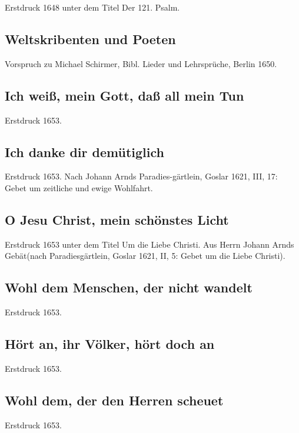 Erstdruck 1648 unter dem Titel \frqq Der 121. Psalm\flqq .

\subsection*{ Weltskribenten und Poeten}

Vorspruch zu Michael Schirmer, \frqq Bibl. Lieder und Lehrsprüche\flqq , Berlin
1650.

\subsection*{ Ich weiß, mein Gott, daß all mein Tun}

Erstdruck 1653.

\subsection*{ Ich danke dir demütiglich}

Erstdruck 1653. Nach Johann Arnds \frqq Paradies-gärtlein\flqq , Goslar 1621, III,
17: \frqq Gebet um zeitliche und ewige Wohlfahrt\flqq .

\subsection*{ O Jesu Christ, mein schönstes Licht}

Erstdruck 1653 unter dem Titel \frqq Um die Liebe Christi. Aus Herrn Johann
Arnds Gebät\flqq  (nach \frqq Paradiesgärtlein\flqq , Goslar 1621, II, 5: \frqq Gebet um die
Liebe Christi\flqq ).

\subsection*{ Wohl dem Menschen, der nicht wandelt}

Erstdruck 1653.

\subsection*{ Hört an, ihr Völker, hört doch an}

Erstdruck 1653.

\subsection*{ Wohl dem, der den Herren scheuet}

Erstdruck 1653.

